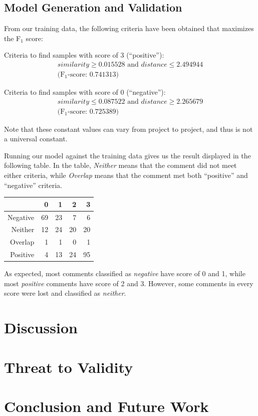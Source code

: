 \documentclass[conference]{IEEEtran}
\begin{document}
\subsection{Model Generation and Validation}

From our training data,
the following criteria have been obtained that maximizes the F$_1$ score:

Criteria to find samples with score of 3 (``positive''):
\begin{gather*} similarity \geq 0.015528 \text{ and } distance \leq 2.494944
\\ \text{(F$_1$-score: 0.741313)} \end{gather*}

Criteria to find samples with score of 0 (``negative''):
\begin{gather*} similarity \leq 0.087522 \text{ and } distance \geq 2.265679
\\ \text{(F$_1$-score: 0.725389)}\end{gather*}

Note that these constant values can vary from project to project, and thus is not a universal constant.


Running our model against the training data gives us the result displayed in the following table.
In the table, \emph{Neither} means that the comment did not meet either criteria, while \emph{Overlap} means that the comment  met both ``positive'' and ``negative'' criteria.

\begin{center}
\begin{tabular}{|r|rrrr|}
\hline
& \bfseries 0 & \bfseries 1 & \bfseries 2 & \bfseries 3 \\
\hline
Negative & 69 & 23 & 7 & 6 \\
Neither & 12 & 24 & 20 & 20 \\
Overlap & 1 & 1 & 0 & 1 \\
Positive & 4 & 13 & 24 & 95 \\
\hline
\end{tabular}
\end{center}

As expected, most comments classified as \emph{negative} have score of 0 and 1,
while most \emph{positive} comments have score of 2 and 3.
However, some comments in every score were lost and classified as \emph{neither}.



\section{Discussion}





\section{Threat to Validity}


\section{Conclusion and Future Work}


\IEEEpeerreviewmaketitle







\end{document}
